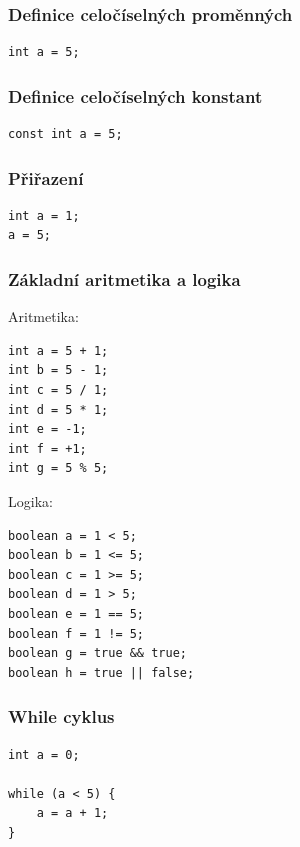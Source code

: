 \documentclass[czech, oth, kiv, he, iso690numb, viewonly]{fasthesis}
\begin{document}
    \subsubsection*{Definice celočíselných proměnných}
    \begin{verbatim}
int a = 5;
    \end{verbatim}

    \subsubsection*{Definice celočíselných konstant}
    \begin{verbatim}
const int a = 5;
    \end{verbatim}

    \subsubsection*{Přiřazení}
    \begin{verbatim}
int a = 1;
a = 5;
    \end{verbatim}

    \subsubsection*{Základní aritmetika a logika}
    Aritmetika:
    \begin{verbatim}
int a = 5 + 1;
int b = 5 - 1;
int c = 5 / 1;
int d = 5 * 1;
int e = -1;
int f = +1;
int g = 5 % 5;
    \end{verbatim}
    Logika:
    \begin{verbatim}
boolean a = 1 < 5;
boolean b = 1 <= 5;
boolean c = 1 >= 5;
boolean d = 1 > 5;
boolean e = 1 == 5;
boolean f = 1 != 5;
boolean g = true && true;
boolean h = true || false;
    \end{verbatim}

    \subsubsection*{While cyklus}
    \begin{verbatim}
int a = 0;

while (a < 5) {
    a = a + 1;
}
    \end{verbatim}
\end{document}
